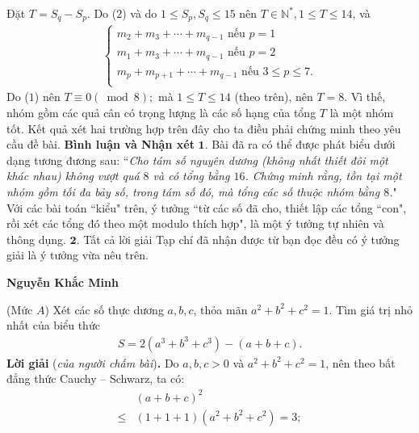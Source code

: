 \begin{multicols}{2}
	\vskip 0.05cm
	Đặt  $T = S_q - S_p$.
	\vskip 0.05cm
	Do ($2$) và do $1 \le {S_p},{S_q} \le 15$  nên \linebreak$T \in \mathbb{N^*}, 1 \le T \le 14$,    và
	\begin{align*}
		\begin{cases}
			m_2 + m_3 + \cdots + m_{q-1} \text{ nếu } p=1 \\
			m_1 + m_3 + \cdots + m_{q-1} \text{ nếu } p=2 \\
			m_p + m_{p+1} + \cdots + m_{q-1} \text{ nếu } 3 \le p \le 7.\\
		\end{cases}
	\end{align*}
	Do ($1$) nên  $T \equiv 0\left( {\bmod 8} \right);$ mà $1 \le T \le 14$ (theo trên), nên $T = 8$. Vì thế, nhóm gồm các quả cân có trọng lượng là các số hạng của tổng $T$ là một nhóm tốt.
	\vskip 0.05cm
	Kết quả xét hai trường hợp trên đây cho ta điều phải chứng minh theo yêu cầu đề bài.
	\vskip 0.05cm
	\textbf{\color{thachthuctoanhoc}Bình luận và Nhận xét}
	\vskip 0.05cm
	$\pmb{1.}$ Bài đã ra có thể được phát biểu dưới dạng tương đương sau:
	\vskip 0.05cm
	``\textit{Cho tám số nguyên dương (không nhất thiết đôi một khác nhau) không vượt quá $8$ và có tổng bằng $16$. Chứng minh rằng, tồn tại một nhóm gồm tối đa bảy số, trong tám số đó, mà tổng các số thuộc nhóm bằng $8$.}"
	\vskip 0.05cm
	Với các bài toán ``kiểu" trên, ý tưởng ``từ các số đã cho, thiết lập các tổng ``con", rồi xét các tổng đó theo một modulo thích hợp", là một ý tưởng tự nhiên và thông dụng.
	\vskip 0.05cm
	$\pmb{2.}$ Tất cả lời giải Tạp chí đã nhận được từ bạn đọc đều có ý tưởng giải là ý tưởng vừa nêu trên.
	\begin{flushright}
		\textbf{\color{thachthuctoanhoc}Nguyễn Khắc Minh}
	\end{flushright}
	{}
	(Mức $A$) Xét các số thực dương $a, b, c$, thỏa mãn $a^2 + b^2 + c^2 =1$.  Tìm giá trị nhỏ nhất của biểu thức
	\begin{align*}
		S = 2\left( {{a^3} + {b^3} + {c^3}} \right) - \left( {a + b + c} \right).
	\end{align*}
	\textbf{\color{thachthuctoanhoc}Lời giải} (\textit{của người chấm bài})\textbf{\color{thachthuctoanhoc}.}
	Do $a, b, c > 0$ và $a^2 + b^2 + c^2 = 1$,  nên theo bất đẳng thức Cauchy -- Schwarz, ta có:
	\begin{align*}
		&{\left( {a + b + c} \right)^2} \\
		\le &\left( {1 + 1 + 1} \right)\left( {{a^2} + {b^2} + {c^2}} \right) = 3; \tag{$1$}\\

\end{align*}
\end{multicols}
